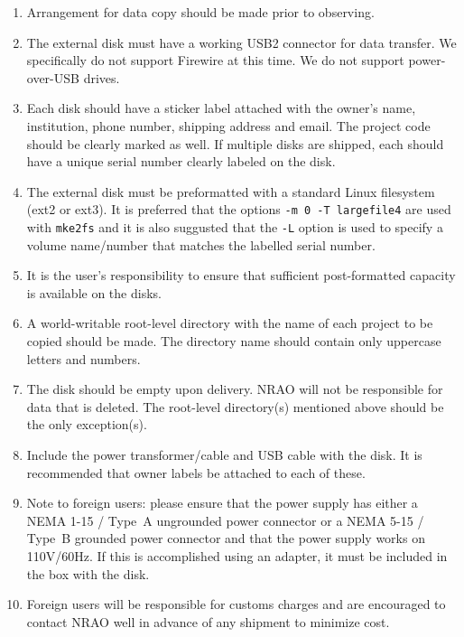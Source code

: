 \begin{enumerate}
\item Arrangement for data copy should be made prior to observing.

\item The external disk must have a working USB2 connector for data transfer.
We specifically do not support Firewire at this time.  
We do not support power-over-USB drives.

\item Each disk should have a sticker label attached with the owner's name, institution, phone number, shipping address and email.  
The project code should be clearly marked as well.  
If multiple disks are shipped, each should have a unique serial number clearly labeled on the disk.

\item The external disk must be preformatted with a standard Linux filesystem (ext2 or ext3).
It is preferred that the options {\tt -m 0 -T largefile4} are used with {\tt mke2fs} and it is also suggusted that the {\tt -L} option is used to specify a volume name/number that matches the labelled serial number.

\item It is the user's responsibility to ensure that sufficient post-formatted capacity is available on the disks.

\item A world-writable root-level directory with the name of each project to be copied should be made.
The directory name should contain only uppercase letters and numbers.

\item The disk should be empty upon delivery.  
NRAO will not be responsible for data that is deleted.  
The root-level directory(s) mentioned above should be the only exception(s).

\item Include the power transformer/cable and USB cable with the disk.  
It is recommended that owner labels be attached to each of these.

\item Note to foreign users: please ensure that the power supply has either a NEMA 1-15 / Type~A ungrounded power connector or a NEMA 5-15 / Type~B grounded power connector and that the power supply works on 110V/60Hz.
If this is accomplished using an adapter, it must be included in the box with the disk.

\item Foreign users will be responsible for customs charges and are encouraged to contact NRAO well in advance of any shipment to minimize cost.

\end{enumerate}




